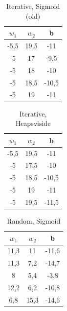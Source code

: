 \documentclass{article}
\begin{document}
        \begin{table}[H]
        \centering
        \caption{Iterative, Sigmoid (old)}
        \begin{tabular}{|c|c|c|}
        \hline
        $w_{1}$ & $w_{2}$ & b\\
        \hline
        -5,5 & 19,5 & -11 \\
        \hline
        -5 & 17 & -9,5 \\
        \hline
        -5 & 18 & -10 \\
        \hline
        -5 & 18,5 & -10,5 \\
        \hline
        -5 & 19 & -11 \\
        \hline
        \end{tabular}
        \end{table}

        \begin{table}[H]
        \centering
        \caption{Iterative, Heapsviside}
        \begin{tabular}{|c|c|c|}
        \hline
        $w_{1}$ & $w_{2}$ & b\\
        \hline
        -5,5 & 19,5 & -11 \\
        \hline
        -5 & 17,5 & -10 \\
        \hline
        -5 & 18,5 & -10,5 \\
        \hline
        -5 & 19 & -11 \\
        \hline
        -5 & 19,5 & -11,5 \\
        \hline
        \end{tabular}
        \end{table}

        \begin{table}[H]
        \centering
        \caption{Random, Sigmoid}
        \begin{tabular}{|c|c|c|}
        \hline
        $w_{1}$ & $w_{2}$ & b\\
        \hline
        11,3 & 11 & -11,6 \\
        \hline
        11,3 & 7,2 & -14,7 \\
        \hline
        8 & 5,4 & -3,8 \\
        \hline
        12,2 & 6,2 & -10,8 \\
        \hline
        6,8 & 15,3 & -14,6 \\
        \hline
        \end{tabular}
        \end{table}
\end{document}
